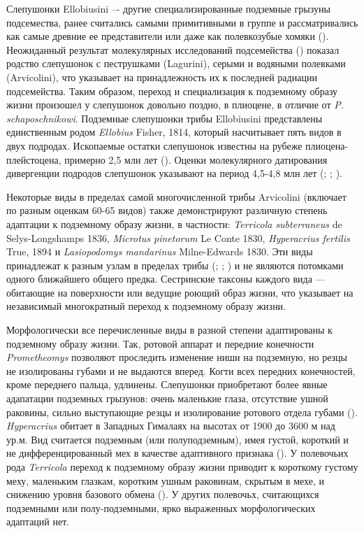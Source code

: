 Слепушонки Ellobiusini –- другие специализированные подземные грызуны подсемества, ранее считались самыми примитивными в группе и рассматривались как самые древние ее представители или даже как полевкозубые хомяки (\cite{Gromov1977}). Неожиданный результат молекулярных исследований подсемейства (\cite{Abramson2009}) показал родство слепушонок с пеструшками (Lagurini), серыми и водяными полевками (Arvicolini), что указывает на принадлежность их к последней радиации подсемейства. Таким образом, переход и специализация к подземному образу жизни произошел у слепушонок довольно поздно, в плиоцене, в отличие от \textit{P. schaposchnikowi}. Подземные слепушонки трибы Ellobiusini представлены единственным родом \textit{Ellobius} Fisher, 1814, который насчитывает пять видов в двух подродах. Ископаемые остатки слепушонок известны на рубеже плиоцена-плейстоцена, примерно 2,5 млн лет (\cite{Lychev1974}). Оценки молекулярного датирования дивергенции подродов слепушонок указывают на период 4,5-4,8 млн лет (\cite{Abramson2009}; \cite{Lebedev2020}; \cite{Abramson2021}). 

Некоторые виды в пределах самой многочисленной трибы Arvicolini (включает по разным оценкам 60-65 видов) также демонстрируют различную степень адаптации к подземному образу жизни, в частности: \textit{Terricola subterraneus} de Selys-Longshamps 1836, \textit{Microtus pinetorum} Le Conte 1830, \textit{Hyperacrius fertilis} True, 1894 и \textit{Lasiopodomys mandarinus} Milne-Edwards 1830. Эти виды принадлежат к разным узлам в пределах трибы (\cite{Abramson2009}; \cite{Martinkova2012}; \cite{Abramson2021}) и не являются потомками одного ближайшего общего предка. Сестринские таксоны каждого вида — обитающие на поверхности или ведущие роющий образ жизни, что указывает на независимый многократный переход к подземному образу жизни. 

Морфологически все перечисленные виды в разной степени адаптированы к подземному образу жизни. Так, ротовой аппарат и передние конечности \textit{Prometheomys} позволяют проследить изменение ниши на подземную, но резцы не изолированы губами и не выдаются вперед. Когти всех передних конечностей, кроме переднего пальца, удлинены. Слепушонки приобретают более явные адапатации подземных грызунов: очень маленькие глаза, отсутствие ушной раковины, сильно выступающие резцы и изолирование ротового отдела губами (\cite{Gromov1977}). \textit{Hyperacrius} обитает в Западных Гималаях на высотах от 1900 до 3600 м над ур.м. Вид считается подземным (или полуподземным), имея густой, короткий и не дифференцированный мех в качестве адаптивного признака (\cite{Gromov1977}). У полевочьих рода \textit{Terricola} переход к подземному образу жизни приводит к короткому густому меху, маленьким глазкам, коротким ушным раковинам, скрытым в мехе, и снижению уровня базового обмена (\cite{Gromov1977}). У других полевочьх, считающихся подземными или полу-подземными, ярко выраженных морфологических адаптаций нет.  

